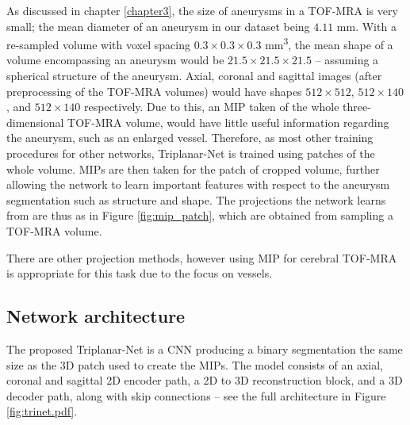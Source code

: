 As discussed in chapter \ref{chapter3}, the size of aneurysms in a TOF-MRA is very small; the mean diameter of an aneurysm in our dataset being $4.11$ mm. With a re-sampled volume with voxel spacing $0.3 \times 0.3 \times 0.3$ mm\textsuperscript{3}, the mean shape of a volume encompassing an aneurysm would be $21.5 \times 21.5 \times 21.5$ -- assuming a spherical structure of the aneurysm. Axial, coronal and sagittal images (after preprocessing of the TOF-MRA volumes) would have shapes $512 \times 512$, $512 \times 140$, and $512 \times 140$ respectively. Due to this, an MIP taken of the whole three-dimensional TOF-MRA volume, would have little useful information regarding the aneurysm, such as an enlarged vessel. Therefore, as most other training procedures for other networks, Triplanar-Net is trained using patches of the whole volume. MIPs are then taken for the patch of cropped volume, further allowing the network to learn important features with respect to the aneurysm segmentation such as structure and shape. The projections the network learns from are thus as in Figure \ref{fig:mip_patch}, which are obtained from sampling a TOF-MRA volume. 

There are other projection methods, however using MIP for cerebral TOF-MRA is appropriate for this task due to the focus on vessels. 


\subsection{Network architecture}
The proposed Triplanar-Net is a CNN producing a binary segmentation the same size as the 3D patch used to create the MIPs. The model consists of an axial, coronal and sagittal 2D encoder path, a 2D to 3D reconstruction block, and a 3D decoder path, along with skip connections -- see the full architecture in Figure \ref{fig:trinet.pdf}. 



